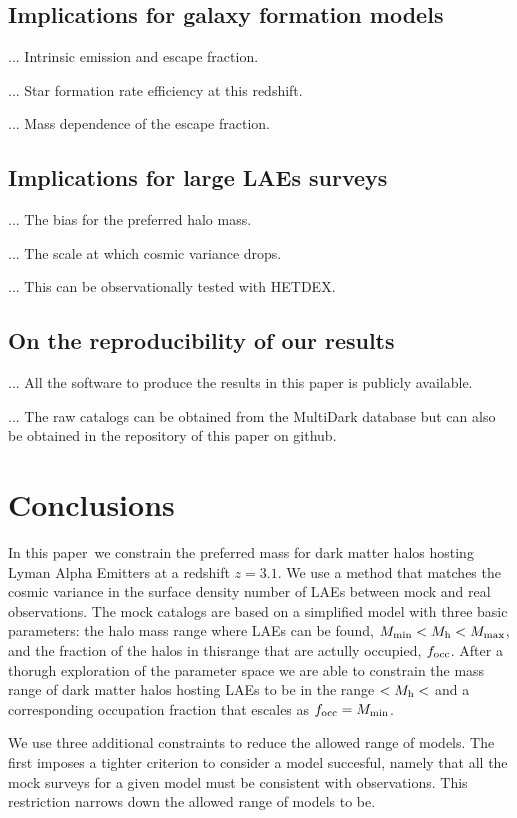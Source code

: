 \documentclass[usenatbib]{mn2e}
\newcommand{\documentname}{paper~}
\begin{document}
\subsection{Implications for galaxy formation models}


... Intrinsic emission and escape fraction.

... Star formation rate efficiency at this redshift.

... Mass dependence of the escape fraction.


\subsection{Implications for large LAEs surveys}

... The bias for the preferred halo mass.

... The scale at which cosmic variance drops.

... This can be observationally tested with HETDEX.

\subsection{On the reproducibility of our results}

... All the software to produce the results in this paper is publicly
available. 

... The raw catalogs can be obtained from the MultiDark database but
can also be obtained in the repository of this paper on github.

\section{Conclusions}
In this \documentname we constrain the preferred mass for dark matter
halos hosting Lyman Alpha Emitters at a redshift $z=3.1$. We use a
method that matches the cosmic variance in the surface
density number of LAEs between mock and real observations. The mock
catalogs are based on a simplified model with three basic parameters: the halo
mass range where LAEs can be found, $M_{\rm   min}<M_{\rm h}<M_{\rm
  max}$, and the fraction of the halos in thisrange that are actully
occupied, $f_{\rm occ}$. After a thorugh exploration of the parameter
space we are able to constrain the mass range of dark matter halos
hosting LAEs to be in the range $<M_{\rm   h}<$ and a corresponding
occupation fraction that escales as $f_{\rm   occ} = M_{\rm min}$. 

We use three additional constraints to reduce the allowed
range of models. The first imposes a tighter criterion to consider a
model succesful, namely that all the mock surveys for a given model
must be consistent with observations. This restriction narrows down
the allowed range of models to be. 
\end{document}
